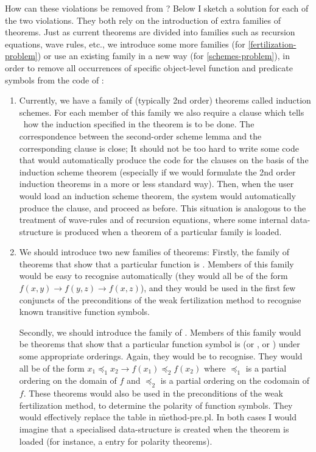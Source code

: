 How can these violations be removed from \clam? Below I sketch
a solution for each of the two violations. They both rely on
the introduction of extra families of theorems. Just as current
theorems are divided into families such as recursion equations, wave
rules, etc., we introduce some more families (for \ref{fertilization-problem})
or use an existing family in a new way (for \ref{schemes-problem}), in
order to remove all occurrences of specific object-level function and
predicate symbols from the code of 
\clam:
\begin{enumerate}
\item
Currently, we have a family of (typically 2nd order) theorems called
induction schemes. For each member of this family we also require a
 clause which tells \clam\ how the induction specified in
the theorem is to be done. The correspondence between the second-order
scheme lemma and the corresponding  clause is close; It
should not be too hard to write some code that would automatically
produce the code for the  clauses on the basis of the
induction scheme theorem (especially if we would formulate the 2nd
order induction theorems in a more or less standard way). Then, when
the user would load an induction scheme theorem, the system would
automatically produce the  clause, and proceed as before.
This situation is analogous to the treatment of wave-rules and of
recursion equations, where some internal data-structure is produced
when a theorem of a particular family is loaded.
\item
We should introduce two new families of theorems: Firstly, the
family of theorems that show that a particular function is
. Members of this family would be easy to recognise
automatically (they would all be of the form
$f(x,y) \rightarrow f(y,z) \rightarrow f(x,z)$),
and they would be used in the first few conjuncts of the preconditions 
of the weak fertilization method to recognise known transitive function
symbols.

Secondly, we should introduce the family of .
Members of this family would be theorems that show that a particular
function symbol is  (or , or )
under some appropriate orderings. Again, they would be to recognise.
They would all be of the form
$x_1 \preceq_1 x_2 \rightarrow f(x_1) \preceq_2 f(x_2)$
where $\preceq_1$ is a partial ordering on the domain of $f$ and
$\preceq_2$ is a partial ordering on the codomain of $f$. These theorems
would also be used in the preconditions of the weak fertilization
method, to determine the polarity of function symbols. They would
effectively replace the  table in \f{method-pre.pl}.
In both cases I would imagine that a specialised data-structure is
created when the theorem is loaded (for instance, a 
entry for polarity theorems). 
\end{enumerate}
  
